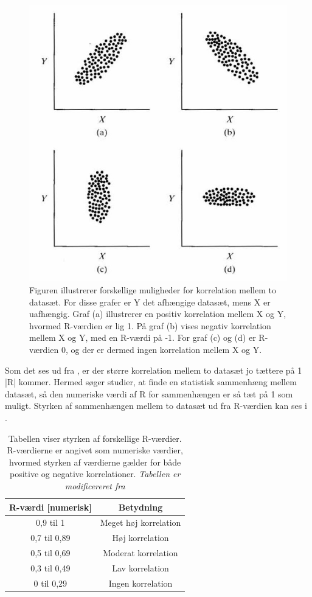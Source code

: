 \begin{figure}[H]
\centering
\includegraphics[width=.4\textwidth]{figures/dHTAanalyse/r_vaerdi}
\caption{Figuren illustrerer forskellige muligheder for korrelation mellem to datasæt. For disse grafer er Y det afhængige datasæt, mens X er uafhængig. Graf (a) illustrerer en positiv korrelation mellem X og Y, hvormed R-værdien er lig 1. På graf (b) vises negativ korrelation mellem X og Y, med en R-værdi på -1. For graf (c) og (d) er R-værdien 0, og der er dermed ingen korrelation mellem X og Y. \citep{Zar2010}} \label{fig:r_vaerdi}
\end{figure}\vspace{-.25cm}

Som det ses ud fra , er der større korrelation mellem to datasæt jo tættere på 1 |R| kommer. Hermed søger studier, at finde en statistisk sammenhæng mellem datasæt, så den numeriske værdi af R for sammenhængen er så tæt på 1 som muligt. Styrken af sammenhængen mellem to datasæt ud fra R-værdien kan ses i . \\

\begin{table}[H]
\centering
\begin{tabular}{cc}
\rowcolor[HTML]{C0C0C0} 
R-værdi {[}numerisk{]} & Betydning  \\ \hline
0,9 til 1              & Meget høj korrelation              \\
0,7 til 0,89            & Høj korrelation                    \\
0,5 til 0,69            & Moderat korrelation                \\
0,3 til 0,49            & Lav korrelation                    \\
0 til 0,29              & Ingen korrelation                  \\ \hline
\end{tabular}
\caption{Tabellen viser styrken af forskellige R-værdier. R-værdierne er angivet som numeriske værdier, hvormed styrken af værdierne gælder for både positive og negative korrelationer. \textit{Tabellen er modificereret fra }}
\label{tab:styrke_r}
\end{table} \vspace{-.25cm}

